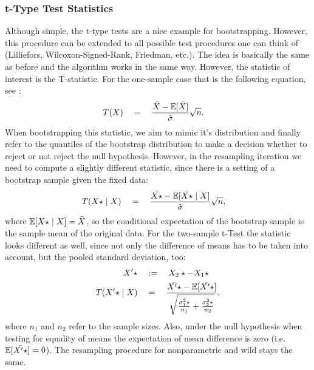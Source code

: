 	\subsubsection*{t-Type Test Statistics}
Although simple, the t-type tests are a nice example for bootstrapping. However, this procedure can be extended to all possible test procedures one can think of (Lilliefors, Wilcoxon-Signed-Rank, Friedman, etc.). The idea is basically the same as before and the algorithm works in the same way. However, the statistic of interest is the T-statistic. For the one-sample case that is the following equation, see \citet{t}:
\begin{align*}
	T(X) \quad &= \quad \frac{\bar{X} - \mathbb{E}[\bar{X}]}{\hat{\sigma}}\sqrt{n}.
\end{align*}
When bootstrapping this statistic, we aim to mimic it's distribution and finally refer to the quantiles of the bootstrap distribution to make a decision whether to reject or not reject the null hypothesis. However, in the resampling iteration we need to compute a slightly different statistic, since there is a setting of a bootstrap sample given the fixed data:
\begin{align*}
	T(X\star \mid X) \quad &= \quad \frac{\bar{X\star} - \mathbb{E}[\bar{X\star} \mid X]}{\hat{\sigma}}\sqrt{n},
\end{align*}
where $\mathbb{E}[X\star \mid X] = \bar{X}$, so the conditional expectation of the bootstrap sample is the sample mean of the original data. For the two-sample t-Test the statistic looks different as well, since not only the difference of means has to be taken into account, but the pooled standard deviation, too:
\begin{align*}
	X'\star \quad &:= \quad X_2\star - X_1\star \\
	T(X'\star \mid X) \quad &= \quad \frac{\bar{X'\star} - \mathbb{E}[\bar{X'\star}]}{\sqrt{\frac{\hat{\sigma_1^2\star}}{n_1} + \frac{\hat{\sigma_2^2\star}}{n_2}}},
\end{align*}
where $n_1$ and $n_2$ refer to the sample sizes. Also, under the null hypothesis when testing for equality of means the expectation of mean difference is zero (i.e. $\mathbb{E}[\bar{X'\star}] = 0$). The resampling procedure for nonparametric and wild stays the same. 

